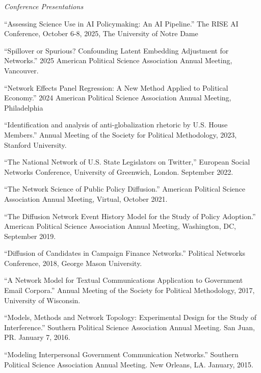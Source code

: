 \documentclass[overlapped,line]{res}
\begin{document}
\begin{resume}
\hspace{-1cm} \emph{Conference Presentations}
\begin{etaremune}
\item ``Assessing Science Use in AI Policymaking: An AI Pipeline.'' The RISE AI Conference, October 6-8, 2025, The University of Notre Dame
\item ``Spillover or Spurious? Confounding Latent Embedding Adjustment for Networks.''  2025 American Political Science Association Annual Meeting, Vancouver. 
\item ``Network Effects Panel Regression: A New Method Applied to Political Economy.''  2024 American Political Science Association Annual Meeting, Philadelphia
\item ``Identification and analysis of anti-globalization rhetoric by U.S. House Members.'' Annual Meeting of the Society for Political Methodology, 2023, Stanford University.
\item ``The National Network of U.S. State Legislators on Twitter,'' European Social Networks Conference, University of Greenwich, London. September 2022. 
\item ``The Network Science of Public Policy Diffusion.'' American Political Science Association Annual Meeting, Virtual, October 2021. 
\item ``The Diffusion Network Event History Model for the Study of Policy Adoption.''  American Political Science Association Annual Meeting, Washington, DC, September 2019. 
\item ``Diffusion of Candidates in Campaign Finance Networks.'' Political Networks Conference, 2018, George Mason University.
\item ``A Network Model for Textual Communications Application to Government Email Corpora.'' Annual Meeting of the Society for Political Methodology, 2017, University of Wisconsin.
\item ``Models, Methods and Network Topology: Experimental Design for the Study of Interference.'' Southern Political Science Association Annual Meeting. San Juan, PR. January 7, 2016. 
\item ``Modeling Interpersonal Government Communication Networks.'' Southern Political Science Association Annual Meeting. New Orleans, LA. January, 2015.
\end{etaremune}


\end{resume}
\end{document}

